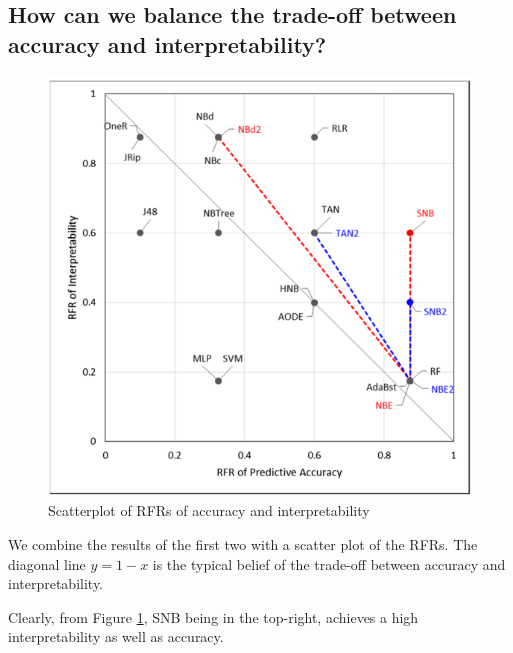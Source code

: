 \documentclass[sigconf]{acmart}
\begin{document}
\subsection{How can we balance the trade-off between accuracy and interpretability?}

\begin{figure}
\centering
\includegraphics[scale=0.25]{fig4.png}
\caption{Scatterplot of RFRs of accuracy and interpretability}
\label{fig:4}
\end{figure}

We combine the results of the first two with a scatter plot of the RFRs. The diagonal line $y=1-x$ is the typical belief of the trade-off between accuracy and interpretability. 

Clearly, from Figure \ref{fig:4}, SNB being in the top-right, achieves a high interpretability as well as accuracy.



\end{document}
